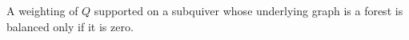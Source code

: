 \begin{corollary}\label{Arden24A-cor-5.2}
\label{Arden24A-cor:subquiver}
A weighting of $Q$ supported on a subquiver whose underlying graph is a forest is balanced only if it is zero.
\end{corollary}